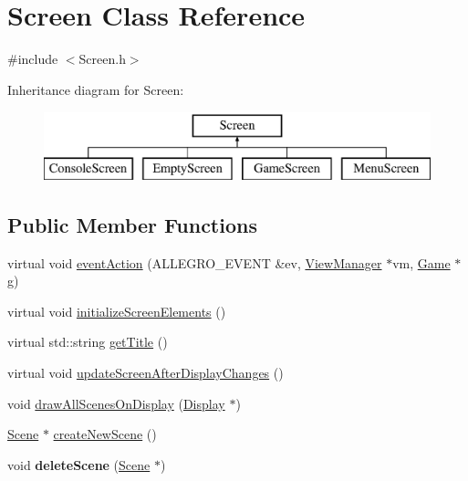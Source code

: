 \hypertarget{classScreen}{}\section{Screen Class Reference}
\label{classScreen}


{\ttfamily \#include $<$Screen.\+h$>$}

Inheritance diagram for Screen\+:\begin{figure}[H]
\begin{center}
\leavevmode
\includegraphics[height=2.000000cm]{classScreen}
\end{center}
\end{figure}
\subsection*{Public Member Functions}
\begin{DoxyCompactItemize}
\item 
virtual void \hyperlink{classScreen_a5fb59d03053c2d0aaca26f9480bbe433}{event\+Action} (A\+L\+L\+E\+G\+R\+O\+\_\+\+E\+V\+E\+NT \&ev, \hyperlink{classViewManager}{View\+Manager} $\ast$vm, \hyperlink{classGame}{Game} $\ast$g)
\item 
virtual void \hyperlink{classScreen_a207320477f0e323dc4cd36dbd4706238}{initialize\+Screen\+Elements} ()
\item 
virtual std\+::string \hyperlink{classScreen_a28df2a95a64693e2e5b1238c07c92115}{get\+Title} ()
\item 
virtual void \hyperlink{classScreen_a0d283acd7432bd4fedd35cd147bdf4a8}{update\+Screen\+After\+Display\+Changes} ()
\item 
void \hyperlink{classScreen_ad576195d9b349d5a2af7844a638ff4e1}{draw\+All\+Scenes\+On\+Display} (\hyperlink{classDisplay}{Display} $\ast$)
\item 
\hyperlink{classScene}{Scene} $\ast$ \hyperlink{classScreen_aee0fb634ec970fa915991093e98b0f34}{create\+New\+Scene} ()
\item 
void {\bfseries delete\+Scene} (\hyperlink{classScene}{Scene} $\ast$)\hypertarget{classScreen_a6a15f10596f89981974c0006e9768a9f}{}\label{classScreen_a6a15f10596f89981974c0006e9768a9f}

\end{DoxyCompactItemize}


